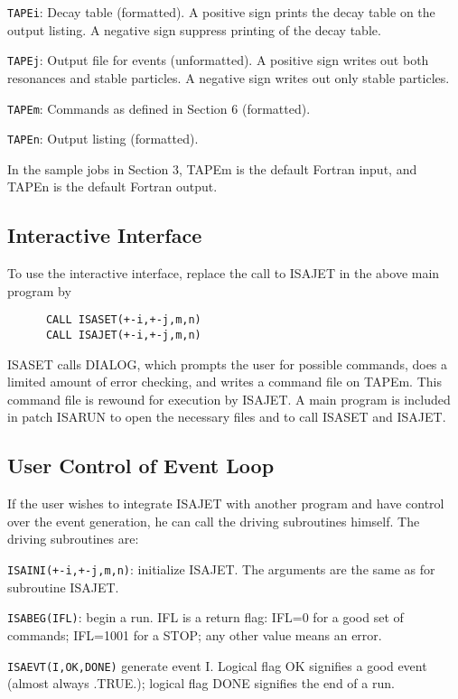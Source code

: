      \verb|TAPEi|: Decay table (formatted). A positive sign prints
the decay table on the output listing. A negative sign suppress
printing of the decay table.

      \verb|TAPEj|: Output file for events (unformatted). A positive
sign writes out both resonances and stable particles. A negative sign
writes out only stable particles.

      \verb|TAPEm|: Commands as defined in Section 6 (formatted).

      \verb|TAPEn|: Output listing (formatted).

\noindent In the sample jobs in Section 3, TAPEm is the default
Fortran input, and TAPEn is the default Fortran output.

\subsection{Interactive Interface}

      To use the interactive interface, replace the call to ISAJET in
the above main program by
\begin{verbatim}
      CALL ISASET(+-i,+-j,m,n)
      CALL ISAJET(+-i,+-j,m,n)
\end{verbatim}
ISASET calls DIALOG, which prompts the user for possible commands,
does a limited amount of error checking, and writes a command file on
TAPEm. This command file is rewound for execution by ISAJET. A main
program is included in patch ISARUN to open the necessary files and to
call ISASET and ISAJET.

\subsection{User Control of Event Loop}

      If the user wishes to integrate ISAJET with another program and
have control over the event generation, he can call the driving
subroutines himself. The driving subroutines are:

      \verb|ISAINI(+-i,+-j,m,n)|: initialize ISAJET. The arguments are
the same as for subroutine ISAJET.

      \verb|ISABEG(IFL)|: begin a run. IFL is a return flag: IFL=0
for a good set of commands; IFL=1001 for a STOP; any other value means
an error.

      \verb|ISAEVT(I,OK,DONE)| generate event I. Logical flag OK
signifies a good event (almost always .TRUE.); logical flag DONE
signifies the end of a run.

